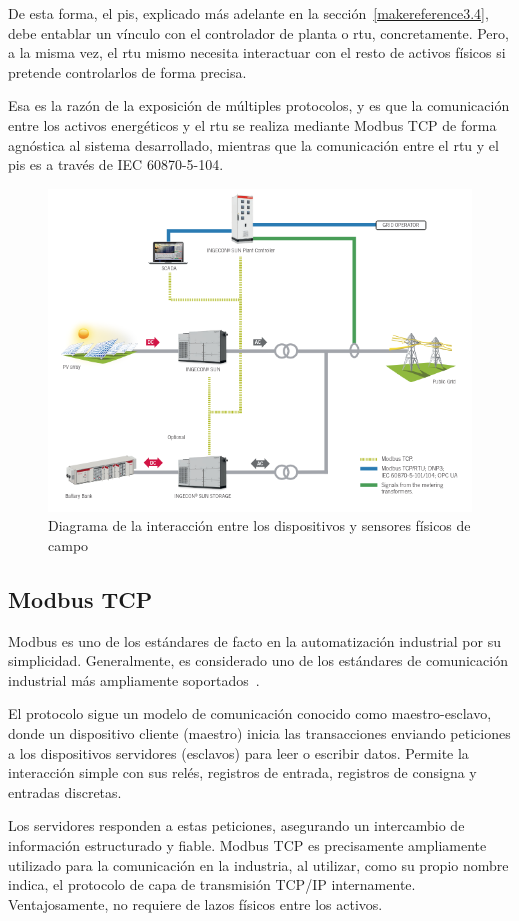 De esta forma, el \gls{pis}, explicado más adelante en la sección~\ref{makereference3.4}, debe entablar un vínculo con el controlador de planta o \gls{rtu}, concretamente. Pero, a la misma vez, el \gls{rtu} mismo necesita interactuar con el resto de activos físicos si pretende controlarlos de forma precisa.

Esa es la razón de la exposición de múltiples protocolos, y es que la comunicación entre los activos energéticos y el \gls{rtu} se realiza mediante Modbus TCP de forma agnóstica al sistema desarrollado, mientras que la comunicación entre el \gls{rtu} y el \gls{pis} es a través de IEC 60870-5-104.

\begin{figure}
  \centering
  \includegraphics[width=0.5\linewidth]{figures/instrumentacion-de-campo.png}
  \caption{Diagrama de la interacción entre los dispositivos y sensores físicos de campo}
  \label{fig:instrumentacion-de-campo}
\end{figure}

\subsection{Modbus TCP}
\label{makereference3.3.1}

Modbus es uno de los estándares de facto en la automatización industrial por su simplicidad. Generalmente, es considerado uno de los estándares de comunicación industrial más ampliamente soportados~\cite{swales1999open}.

El protocolo sigue un modelo de comunicación conocido como maestro-esclavo, donde un dispositivo cliente (maestro) inicia las transacciones enviando peticiones a los dispositivos servidores (esclavos) para leer o escribir datos. Permite la interacción simple con sus relés, registros de entrada, registros de consigna y entradas discretas.

Los servidores responden a estas peticiones, asegurando un intercambio de información estructurado y fiable. Modbus TCP es precisamente ampliamente utilizado para la comunicación en la industria, al utilizar, como su propio nombre indica, el protocolo de capa de transmisión TCP/IP internamente. Ventajosamente, no requiere de lazos físicos entre los activos.

